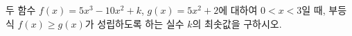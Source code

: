 두 함수 $f(x)=5x^3-10x^2+k$, $g(x)=5x^2+2$에 대하여 $0<x<3$일 때, 부등식 $f(x)\ge g(x)$가 성립하도록 하는 실수 $k$의 최솟값을 구하시오.
